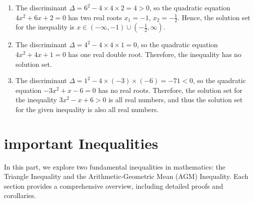 \begin{enumerate}
    \item The discriminant \(\Delta = 6^2 - 4 \times 4 \times 2 = 4 > 0\), so the quadratic equation \(4x^2 + 6x + 2 = 0\) has two real roots \(x_1 = -1\), \(x_2 = -\frac{1}{2}\).
    Hence, the solution set for the inequality is \(x \in \left(-\infty, -1\right) \cup \left(-\frac{1}{2}, \infty\right)\).

    \item The discriminant \(\Delta = 4^2 - 4 \times 4 \times 1 = 0\), so the quadratic equation \(4x^2 + 4x + 1 = 0\) has one real double root. Therefore, the inequality has no solution set.

    \item The discriminant \(\Delta = 1^2 - 4 \times (-3) \times (-6) = -71 < 0\), so the quadratic equation \(-3x^2 + x - 6 = 0\) has no real roots.
    Therefore, the solution set for the inequality \(3x^2 - x + 6 > 0\) is all real numbers, and thus the solution set for the given inequality is also all real numbers.
\end{enumerate}

\section{important Inequalities}
In this part, we explore two fundamental inequalities in mathematics: the Triangle Inequality and the Arithmetic-Geometric Mean (AGM) Inequality. Each section provides a comprehensive overview, including detailed proofs and corollaries.

